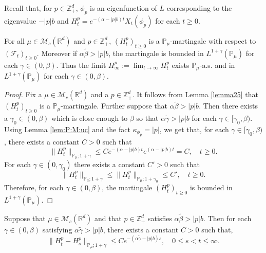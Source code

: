 \documentclass[EJP]{ejpecp} %
\begin{document}
Recall that, for $p\in \mathbb Z_+^d$,  $\phi_p$ is an eigenfunction of $L$ corresponding to the eigenvalue $-|p|b$ and $ H_t^p =e^{-(\alpha-|p|b)t}X_t(\phi_p)$ for each $t\geq 0$.

\begin{lemma}
  \label{lem:M:L:ML}
   For all $\mu\in \mathcal M_c(\mathbb R^d)$ and $p \in \mathbb Z_+^d$, $(H^p_t)_{t\geq 0}$ is a $\mathbb P_{\mu}$-martingale with respect to $(\mathscr F_t)_{t\geq 0}$.
    Moreover if $\alpha\tilde \beta>|p|b$, the martingale is bounded in $L^{1+\gamma}(\mathbb P_\mu)$ for each $\gamma\in (0, \beta)$.
  Thus the limit $ H_{\infty}^p := \lim_{t\rightarrow \infty}H_t^p $  exists $\mathbb{P}_{\mu}$-a.s. and in $L^{1+\gamma}(\mathbb{P}_{\mu})$ for each $\gamma \in (0,\beta)$.
\end{lemma}

\begin{proof}
  Fix a $\mu \in \mathcal M_c(\mathbb R^d)$ and a $p \in \mathbb Z_+^d$.
  It follows from Lemma \ref{lemma25} that $(H_t^p)_{t\geq 0}$ is a $\mathbb P_\mu$-martingale.
  Further suppose that $\alpha \tilde \beta > |p| b$.
  Then there exists a $\gamma_0 \in (0,\beta)$ which is close enough to $\beta$ so that $\alpha\tilde \gamma>|p|b$ for each $\gamma\in [\gamma_0, \beta)$.
  Using  Lemma \ref{lem:P:M:uc} and the fact $\kappa_{\phi_p}=|p|$, we get that, for each $\gamma\in [\gamma_0, \beta)$, there exists a constant $C>0$ such that
  \[
    \|H_t^p\|_{\mathbb P_\mu;1+\gamma}
    \leq C e^{-(\alpha-|p|b)t}e^{(\alpha-|p|b)t}
    = C
    , \quad t\geq 0.
  \]
  For each $\gamma\in (0, \gamma_0)$ there exists a constant $C'>0$ such that
  \[
    \| H_t^p \|_{\mathbb P_\mu;1+\gamma}
    \leq \| H_t^p \|_{\mathbb P_\mu;1+\gamma_0}
    \leq C',
    \quad t\geq 0.
  \]
  Therefore, for each $\gamma \in (0,\beta)$, the martingale $(H_t^p)_{t\geq 0}$ is bounded in $L^{1+\gamma}(\mathbb{P}_{\mu})$.
\end{proof}

\begin{lemma}
  \label{lem: control of wt}
  Suppose that $\mu\in \mathcal M_c(\mathbb R^d)$ and that $p \in \mathbb Z_+^d$ satisfies $\alpha \tilde \beta > |p|b$.
  Then for each $\gamma \in (0,\beta)$ satisfying $\alpha \tilde \gamma > |p|b$, there exists a constant $C> 0$ such that,
  \[
    \|H^p_t-H^p_s\|_{\mathbb{P}_{\mu};1+\gamma}
    \leq C e^{-(\alpha \tilde \gamma-|p|b)s},
    \quad 0 \leq s < t \leq \infty.
  \]
\end{lemma}
\end{document}
